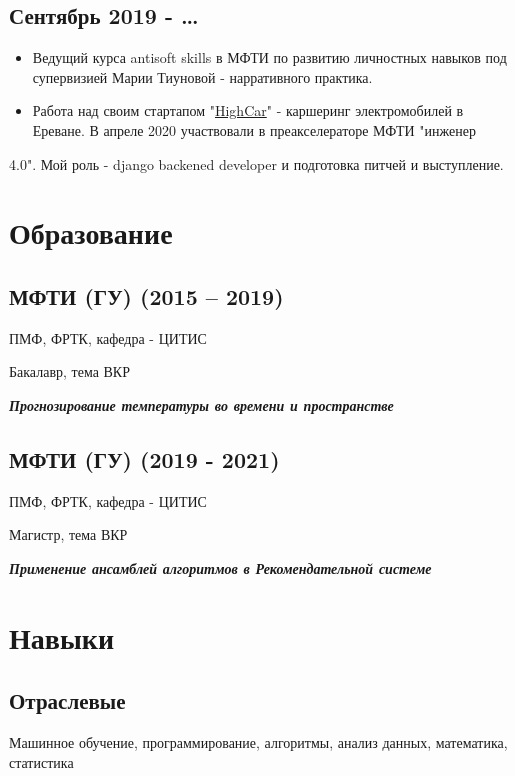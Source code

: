 \documentclass[11pt]{article}
\begin{document}
\subsection{Сентябрь 2019 - \ldots{}}
\label{sec:orgdbb1fc6}
\begin{itemize}
\item Ведущий курса antisoft skills в МФТИ по развитию личностных навыков под супервизией Марии Тиуновой - нарративного практика.
\item Работа над своим стартапом "\href{https://docs.google.com/presentation/d/1AiwyzLKDgDXIaclUwoyGgT-VDJMtJYJQqAMVfbNlB40/edit\#slide=id.p1}{HighCar}" - каршеринг электромобилей в Ереване. В апреле 2020 участвовали в преакселераторе МФТИ "инженер
\end{itemize}
4.0". Мой роль - django backened developer и подготовка питчей и выступление.
\section{Образование}
\label{sec:org24867c9}
\subsection{МФТИ (ГУ) (2015 – 2019)}
\label{sec:orgb3ac79a}
ПМФ, ФРТК, кафедра - ЦИТИС

Бакалавр, тема ВКР

\begin{center}
\textbf{\emph{Прогнозирование температуры во времени и пространстве}}
\end{center}
\subsection{МФТИ (ГУ) (2019 - 2021)}
\label{sec:org8f3a2f6}
ПМФ, ФРТК, кафедра - ЦИТИС

Магистр, тема ВКР
\begin{center}
\textbf{\emph{Применение ансамблей алгоритмов в Рекомендательной системе}}
\end{center}

\section{Навыки}
\label{sec:org9d57f95}
\subsection{Отраслевые}
\label{sec:org1aeb4ea}
Машинное обучение, программирование, алгоритмы, анализ данных, математика, статистика
\end{document}
